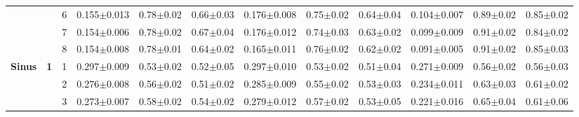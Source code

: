 \begin{table*}
{\begin{tabular}{|l|c|c||c|c|c||c|c|c||c|c|c|}
 & & 6 & \textcolor{gate_color}{0.155$\pm$0.013} & \textcolor{gate_color}{0.78$\pm$0.02} & \textcolor{gate_color}{0.66$\pm$0.03} & \textcolor{mixed_color}{0.176$\pm$0.008} & \textcolor{mixed_color}{0.75$\pm$0.02} & \textcolor{mixed_color}{0.64$\pm$0.04} & \textcolor{pulsed_color}{0.104$\pm$0.007} & \textcolor{pulsed_color}{0.89$\pm$0.02} & \textcolor{pulsed_color}{0.85$\pm$0.02} \\
 & & 7 & \textcolor{gate_color}{0.154$\pm$0.006} & \textcolor{gate_color}{0.78$\pm$0.02} & \textcolor{gate_color}{0.67$\pm$0.04} & \textcolor{mixed_color}{0.176$\pm$0.012} & \textcolor{mixed_color}{0.74$\pm$0.03} & \textcolor{mixed_color}{0.63$\pm$0.02} & \textcolor{pulsed_color}{0.099$\pm$0.009} & \textcolor{pulsed_color}{0.91$\pm$0.02} & \textcolor{pulsed_color}{0.84$\pm$0.02} \\
 & & 8 & \textcolor{gate_color}{0.154$\pm$0.008} & \textcolor{gate_color}{0.78$\pm$0.01} & \textcolor{gate_color}{0.64$\pm$0.02} & \textcolor{mixed_color}{0.165$\pm$0.011} & \textcolor{mixed_color}{0.76$\pm$0.02} & \textcolor{mixed_color}{0.62$\pm$0.02} & \textcolor{pulsed_color}{0.091$\pm$0.005} & \textcolor{pulsed_color}{0.91$\pm$0.02} & \textcolor{pulsed_color}{0.85$\pm$0.03} \\
\hline\hline
\multirow{12}{*}{\textbf{Sinus}} & \multirow{8}{*}{\textbf{1}} & 1 & \textcolor{gate_color}{0.297$\pm$0.009} & \textcolor{gate_color}{0.53$\pm$0.02} & \textcolor{gate_color}{0.52$\pm$0.05} & \textcolor{mixed_color}{0.297$\pm$0.010} & \textcolor{mixed_color}{0.53$\pm$0.02} & \textcolor{mixed_color}{0.51$\pm$0.04} & \textcolor{pulsed_color}{0.271$\pm$0.009} & \textcolor{pulsed_color}{0.56$\pm$0.02} & \textcolor{pulsed_color}{0.56$\pm$0.03} \\
 & & 2 & \textcolor{gate_color}{0.276$\pm$0.008} & \textcolor{gate_color}{0.56$\pm$0.02} & \textcolor{gate_color}{0.51$\pm$0.02} & \textcolor{mixed_color}{0.285$\pm$0.009} & \textcolor{mixed_color}{0.55$\pm$0.02} & \textcolor{mixed_color}{0.53$\pm$0.03} & \textcolor{pulsed_color}{0.234$\pm$0.011} & \textcolor{pulsed_color}{0.63$\pm$0.03} & \textcolor{pulsed_color}{0.61$\pm$0.02} \\
 & & 3 & \textcolor{gate_color}{0.273$\pm$0.007} & \textcolor{gate_color}{0.58$\pm$0.02} & \textcolor{gate_color}{0.54$\pm$0.02} & \textcolor{mixed_color}{0.279$\pm$0.012} & \textcolor{mixed_color}{0.57$\pm$0.02} & \textcolor{mixed_color}{0.53$\pm$0.05} & \textcolor{pulsed_color}{0.221$\pm$0.016} & \textcolor{pulsed_color}{0.65$\pm$0.04} & \textcolor{pulsed_color}{0.61$\pm$0.06} \\

\end{tabular}}
\end{table*}
